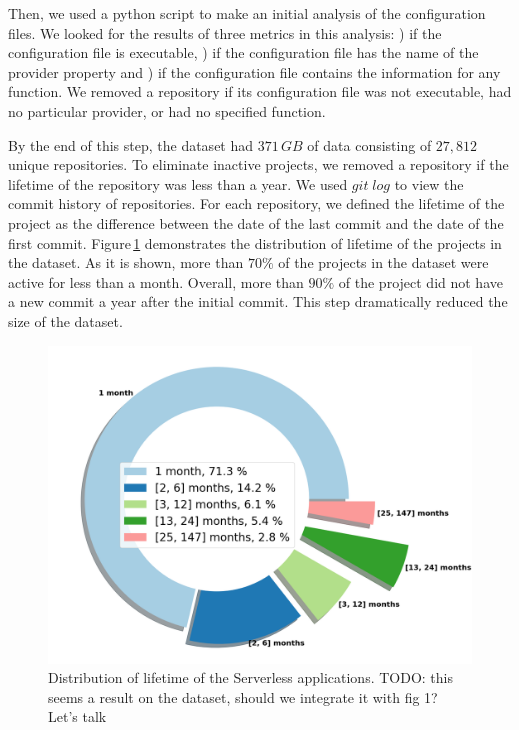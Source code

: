 Then, we used a python script to make an initial analysis of the 
configuration files. We looked for the results of three metrics in this 
analysis: ) if the configuration file is executable, ) if 
the configuration file has the name of the provider property and 
) if the configuration file contains the information for any 
function. We removed a repository if its configuration file was not 
executable, had no particular provider, or had no specified function.

By the end of this step, the dataset had $371 \, GB$ of data consisting 
of $27,812$ unique repositories. To eliminate inactive projects, we 
removed a repository if the lifetime of the repository was less than 
a year. We used $git \; log$ to view the commit history of repositories. 
For each repository, we defined the lifetime of the project as the difference 
between the date of the last commit and the date of the first commit. 
Figure\,\ref{fig:lifetime} demonstrates the distribution of lifetime of the 
projects in the dataset. As it is shown, more than $70\%$ of the projects 
in the dataset were active for less than a month. Overall, more than $90\%$ 
of the project did not have a new commit a year after the initial commit. 
This step dramatically reduced the size of the dataset.

\begin{figure}
	\centering
	\includegraphics[scale=0.25]{figures/lifetime}
	\caption{Distribution of lifetime of the Serverless applications. 
	TODO: this seems a result on the dataset, should we integrate it with fig 1? Let's talk}
	\label{fig:lifetime}
\end{figure}


